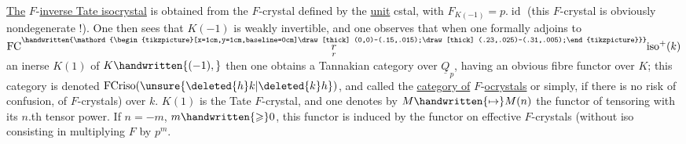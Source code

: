 \uline{The} $F$-\uline{inverse Tate isocrystal} is obtained from the $F$-crystal defined by the \uline{unit} cstal, with $F_{K(-1)}=p.\operatorname{id}$ (this $F$-crystal is obviously nondegenerate !). One then sees that $K(-1)$ is weakly invertible, and one observes that when one formally adjoins to $\mathrm{FC}\overset{\handwritten{\mathord{\begin{tikzpicture}[x=1cm,y=1cm,baseline=0cm]\draw[thick] (0,0)--(.15,.015);\draw[thick] (.23,.025)--(.31,.005);\end{tikzpicture}}}}{\underset{r}{r}}\mathrm{iso}^{+}(k)$  an inerse $K(1)$ of $K\handwritten{(-1),}$ then one obtains a Tannakian category over $\underline{Q}_p$, having an obvious fibre functor over $K$; this category is denoted $\operatorname{FCriso}(\unsure{\deleted{h}k|\deleted{k}h})$, and called the \uline{category of} $F$-\uline{ocrystals} \handwritten{(}or simply, if there  is no risk of confusion, of $F$-crystals) over $k$. $K(1)$ is the Tate $F$-crystal, and one denotes by $M\handwritten{\mapsto}M(n)$ the functor of tensoring with its $n$.th tensor power. If $n=-m$, $m\handwritten{\geqslant}0$, this functor is induced by the functor on effective $F$-crystals (without iso\unsure{)} consisting in multiplying $F$ by $p^m$.

